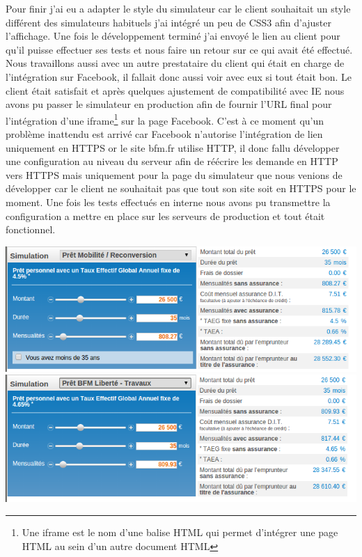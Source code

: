 \documentclass[a4paper,11pt,twoside]{report}
\begin{document}
      
      Pour finir j'ai eu a adapter le style du simulateur car le client souhaitait un style différent des simulateurs habituels j'ai intégré un peu de CSS3 afin d'ajuster l'affichage. Une fois le développement terminé j'ai envoyé le lien au client pour qu'il puisse effectuer ses tests et nous faire un retour sur ce qui avait été effectué. Nous travaillons aussi avec un autre prestataire du client qui était en charge de l'intégration sur Facebook, il fallait donc aussi voir avec eux si tout était bon. Le client était satisfait et après quelques ajustement de compatibilité avec IE nous avons pu passer le simulateur en production afin de fournir l'URL final pour l'intégration d'une iframe\footnote{Une iframe est le nom d'une balise HTML qui permet d'intégrer une page HTML au sein d'un autre document HTML} sur la page Facebook. C'est à ce moment qu'un problème inattendu est arrivé car Facebook n'autorise l'intégration de lien uniquement en HTTPS or le site bfm.fr utilise HTTP, il donc fallu développer une configuration au niveau du serveur afin de réécrire les demande en HTTP vers HTTPS mais uniquement pour la page du simulateur que nous venions de développer car le client ne souhaitait pas que tout son site soit en HTTPS pour le moment. Une fois les tests effectués en interne nous avons pu transmettre la configuration a mettre en place sur les serveurs de production et tout était fonctionnel.
      \label{global_loan_simulator_3}
      
      \begin{center}
	\includegraphics[width=\textwidth]{images/global_simulator1.png} 
	\includegraphics[width=\textwidth]{images/global_simulator2.png} 
	\label{global_simulator1}
      \end{center}
\end{document}
